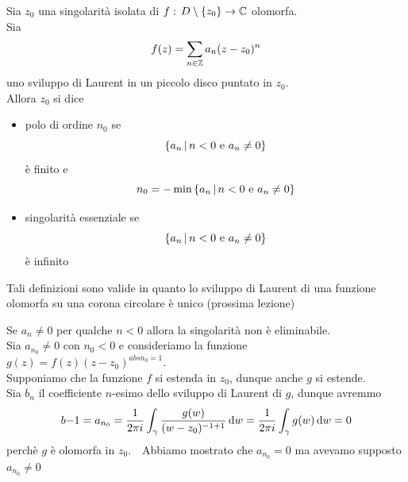 \begin{defn}Sia $z_0$ una singolarit\`a isolata di $f:\, D\setminus \left\{ z_0 \right\}\to \mathbb{C}$ olomorfa.\\
Sia 
$$ f(z) =\sum_{n \in \mathbb{Z}} a_n (z-z_0)^n$$
uno sviluppo di Laurent in un piccolo disco puntato in $z_0$.\\
Allora $z_0$ si dice
\begin{itemize}
\item polo di ordine $n_0$ se 
$$ \left\{  a_n \, \vert \, n< 0 \text{ e } a_n \neq 0  \right\}$$ 
\`e finito e 
$$ n_0 = -\min  \left\{  a_n \, \vert \, n< 0 \text{ e } a_n \neq 0  \right\}$$
\item singolarit\`a essenziale se 
$$  \left\{  a_n \, \vert \, n< 0 \text{ e } a_n \neq 0  \right\}$$
\`e infinito
\end{itemize}
\begin{oss}Tali definizioni sono valide in quanto lo sviluppo di Laurent di una funzione olomorfa su una corona circolare \`e unico (prossima lezione)
\end{oss}
\end{defn}
\begin{oss}Se $a_n\neq 0$ per qualche $n<0$ allora la singolarit\`a non \`e eliminabile.\\
Sia $a_{n_0} \neq 0$ con $n_0<0$ e consideriamo la funzione $g(z) = f(z)( z-z_0)^{abs{n_0} =1}$.\\
Supponiamo che la funzione $f$ si estenda in $z_0$, dunque anche $g$ si estende.\\
Sia $b_n$ il coefficiente $n$-esimo dello sviluppo di Laurent di $g$, dunque avremmo 
$$ b{-1} = a_{n_0} = \frac{1}{2\pi i } \int_{\gamma} \frac{g(w)}{(w-z_0)^{-1+1}} \, \mathrm{d} w = \frac{1}{2\pi i } \int_\gamma g(w) \, \mathrm{d} w =0$$ 
perch\`e $g$ \`e olomorfa in $z_0$.\
\
Abbiamo mostrato che $a_{n_0} = 0 $ ma avevamo supposto $a_{n_0} \neq 0 $\end{oss}
